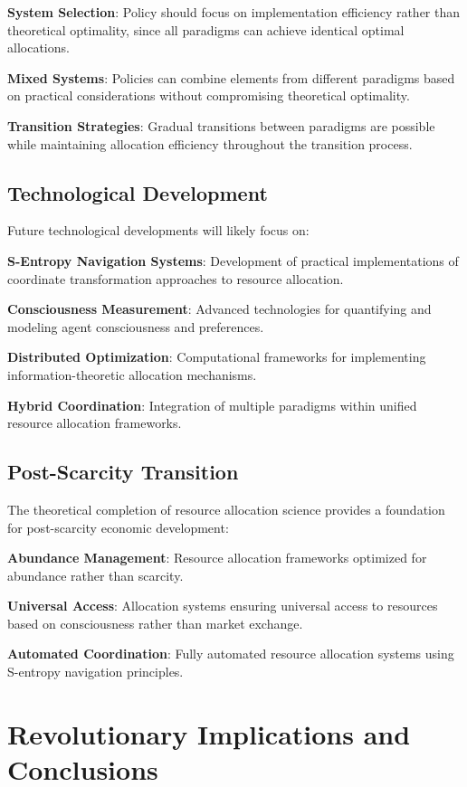 \documentclass[12pt,a4paper]{article}
\begin{document}
\textbf{System Selection}: Policy should focus on implementation efficiency rather than theoretical optimality, since all paradigms can achieve identical optimal allocations.

\textbf{Mixed Systems}: Policies can combine elements from different paradigms based on practical considerations without compromising theoretical optimality.

\textbf{Transition Strategies}: Gradual transitions between paradigms are possible while maintaining allocation efficiency throughout the transition process.

\subsection{Technological Development}

Future technological developments will likely focus on:

\textbf{S-Entropy Navigation Systems}: Development of practical implementations of coordinate transformation approaches to resource allocation.

\textbf{Consciousness Measurement}: Advanced technologies for quantifying and modeling agent consciousness and preferences.

\textbf{Distributed Optimization}: Computational frameworks for implementing information-theoretic allocation mechanisms.

\textbf{Hybrid Coordination}: Integration of multiple paradigms within unified resource allocation frameworks.

\subsection{Post-Scarcity Transition}

The theoretical completion of resource allocation science provides a foundation for post-scarcity economic development:

\textbf{Abundance Management}: Resource allocation frameworks optimized for abundance rather than scarcity.

\textbf{Universal Access}: Allocation systems ensuring universal access to resources based on consciousness rather than market exchange.

\textbf{Automated Coordination}: Fully automated resource allocation systems using S-entropy navigation principles.

\section{Revolutionary Implications and Conclusions}
\end{document}
